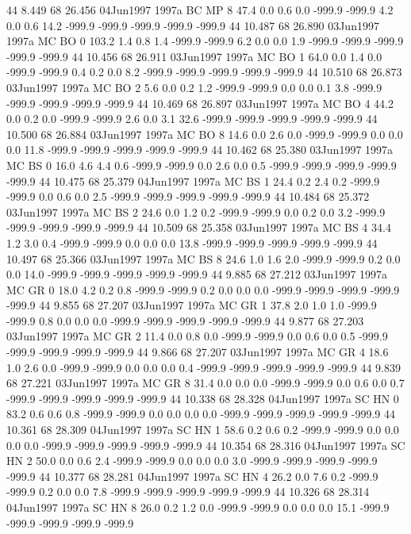44 8.449	68 26.456	04Jun1997	1997a	BC	MP	8	47.4	0.0	0.6	0.0	-999.9	-999.9	4.2	0.0	0.6	14.2	-999.9	-999.9	-999.9	-999.9	-999.9
44 10.487	68 26.890	03Jun1997	1997a	MC	BO	0	103.2	1.4	0.8	1.4	-999.9	-999.9	6.2	0.0	0.0	1.9	-999.9	-999.9	-999.9	-999.9	-999.9
44 10.456	68 26.911	03Jun1997	1997a	MC	BO	1	64.0	0.0	1.4	0.0	-999.9	-999.9	0.4	0.2	0.0	8.2	-999.9	-999.9	-999.9	-999.9	-999.9
44 10.510	68 26.873	03Jun1997	1997a	MC	BO	2	5.6	0.0	0.2	1.2	-999.9	-999.9	0.0	0.0	0.1	3.8	-999.9	-999.9	-999.9	-999.9	-999.9
44 10.469	68 26.897	03Jun1997	1997a	MC	BO	4	44.2	0.0	0.2	0.0	-999.9	-999.9	2.6	0.0	3.1	32.6	-999.9	-999.9	-999.9	-999.9	-999.9
44 10.500	68 26.884	03Jun1997	1997a	MC	BO	8	14.6	0.0	2.6	0.0	-999.9	-999.9	0.0	0.0	0.0	11.8	-999.9	-999.9	-999.9	-999.9	-999.9
44 10.462	68 25.380	03Jun1997	1997a	MC	BS	0	16.0	4.6	4.4	0.6	-999.9	-999.9	0.0	2.6	0.0	0.5	-999.9	-999.9	-999.9	-999.9	-999.9
44 10.475	68 25.379	04Jun1997	1997a	MC	BS	1	24.4	0.2	2.4	0.2	-999.9	-999.9	0.0	0.6	0.0	2.5	-999.9	-999.9	-999.9	-999.9	-999.9
44 10.484	68 25.372	03Jun1997	1997a	MC	BS	2	24.6	0.0	1.2	0.2	-999.9	-999.9	0.0	0.2	0.0	3.2	-999.9	-999.9	-999.9	-999.9	-999.9
44 10.509	68 25.358	03Jun1997	1997a	MC	BS	4	34.4	1.2	3.0	0.4	-999.9	-999.9	0.0	0.0	0.0	13.8	-999.9	-999.9	-999.9	-999.9	-999.9
44 10.497	68 25.366	03Jun1997	1997a	MC	BS	8	24.6	1.0	1.6	2.0	-999.9	-999.9	0.2	0.0	0.0	14.0	-999.9	-999.9	-999.9	-999.9	-999.9
44 9.885	68 27.212	03Jun1997	1997a	MC	GR	0	18.0	4.2	0.2	0.8	-999.9	-999.9	0.2	0.0	0.0	0.0	-999.9	-999.9	-999.9	-999.9	-999.9
44 9.855	68 27.207	03Jun1997	1997a	MC	GR	1	37.8	2.0	1.0	1.0	-999.9	-999.9	0.8	0.0	0.0	0.0	-999.9	-999.9	-999.9	-999.9	-999.9
44 9.877	68 27.203	03Jun1997	1997a	MC	GR	2	11.4	0.0	0.8	0.0	-999.9	-999.9	0.0	0.6	0.0	0.5	-999.9	-999.9	-999.9	-999.9	-999.9
44 9.866	68 27.207	03Jun1997	1997a	MC	GR	4	18.6	1.0	2.6	0.0	-999.9	-999.9	0.0	0.0	0.0	0.4	-999.9	-999.9	-999.9	-999.9	-999.9
44 9.839	68 27.221	03Jun1997	1997a	MC	GR	8	31.4	0.0	0.0	0.0	-999.9	-999.9	0.0	0.6	0.0	0.7	-999.9	-999.9	-999.9	-999.9	-999.9
44 10.338	68 28.328	04Jun1997	1997a	SC	HN	0	83.2	0.6	0.6	0.8	-999.9	-999.9	0.0	0.0	0.0	0.0	-999.9	-999.9	-999.9	-999.9	-999.9
44 10.361	68 28.309	04Jun1997	1997a	SC	HN	1	58.6	0.2	0.6	0.2	-999.9	-999.9	0.0	0.0	0.0	0.0	-999.9	-999.9	-999.9	-999.9	-999.9
44 10.354	68 28.316	04Jun1997	1997a	SC	HN	2	50.0	0.0	0.6	2.4	-999.9	-999.9	0.0	0.0	0.0	3.0	-999.9	-999.9	-999.9	-999.9	-999.9
44 10.377	68 28.281	04Jun1997	1997a	SC	HN	4	26.2	0.0	7.6	0.2	-999.9	-999.9	0.2	0.0	0.0	7.8	-999.9	-999.9	-999.9	-999.9	-999.9
44 10.326	68 28.314	04Jun1997	1997a	SC	HN	8	26.0	0.2	1.2	0.0	-999.9	-999.9	0.0	0.0	0.0	15.1	-999.9	-999.9	-999.9	-999.9	-999.9
